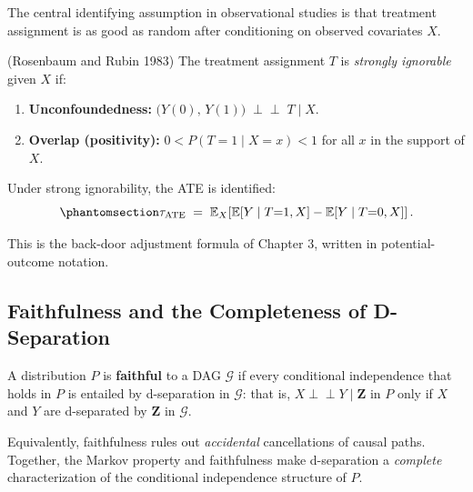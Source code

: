 \documentclass[
  a4paper,
]{book}
\providecommand{\tightlist}{%
  \setlength{\itemsep}{0pt}\setlength{\parskip}{0pt}}
\newcommand{\indep}{\perp\!\!\!\perp}
\newcommand{\E}{\mathbb{E}}
\newcommand{\Gcal}{\mathcal{G}}
\begin{document}
The central identifying assumption in observational studies is that
treatment assignment is as good as random after conditioning on observed
covariates \(X\).

\begin{tcolorbox}[enhanced jigsaw, arc=.35mm, bottomrule=.15mm, bottomtitle=1mm, breakable, colback=white, colbacktitle=quarto-callout-note-color!10!white, colframe=quarto-callout-note-color-frame, coltitle=black, left=2mm, leftrule=.75mm, opacityback=0, opacitybacktitle=0.6, rightrule=.15mm, title={Definition: Strong Ignorability}, titlerule=0mm, toprule=.15mm, toptitle=1mm]

(Rosenbaum and Rubin 1983) The treatment assignment \(T\) is
\emph{strongly ignorable} given \(X\) if:

\begin{enumerate}
\def\labelenumi{\arabic{enumi}.}
\tightlist
\item
  \textbf{Unconfoundedness:}
  \(\bigl(Y(0),\, Y(1)\bigr) \;\indep\; T \mid X\).
\item
  \textbf{Overlap (positivity):} \(0 < P(T{=}1 \mid X{=}x) < 1\) for all
  \(x\) in the support of \(X\).
\end{enumerate}

\end{tcolorbox}

Under strong ignorability, the ATE is identified:
\begin{equation}\protect\phantomsection\label{eq-ate-id}{\tau_{\mathrm{ATE}} \;=\; \E_X\!\left[\E[Y \mid T{=}1, X] - \E[Y \mid T{=}0, X]\right].}\end{equation}

This is the back-door adjustment formula of Chapter 3, written in
potential-outcome notation.

\subsection{Faithfulness and the Completeness of
D-Separation}\label{faithfulness-and-the-completeness-of-d-separation}

\begin{tcolorbox}[enhanced jigsaw, arc=.35mm, bottomrule=.15mm, bottomtitle=1mm, breakable, colback=white, colbacktitle=quarto-callout-note-color!10!white, colframe=quarto-callout-note-color-frame, coltitle=black, left=2mm, leftrule=.75mm, opacityback=0, opacitybacktitle=0.6, rightrule=.15mm, title={Definition: Faithfulness}, titlerule=0mm, toprule=.15mm, toptitle=1mm]

A distribution \(P\) is \textbf{faithful} to a DAG \(\Gcal\) if every
conditional independence that holds in \(P\) is entailed by d-separation
in \(\Gcal\): that is, \(X \indep Y \mid \mathbf{Z}\) in \(P\) only if
\(X\) and \(Y\) are d-separated by \(\mathbf{Z}\) in \(\Gcal\).

Equivalently, faithfulness rules out \emph{accidental} cancellations of
causal paths. Together, the Markov property and faithfulness make
d-separation a \emph{complete} characterization of the conditional
independence structure of \(P\).

\end{tcolorbox}
\end{document}
